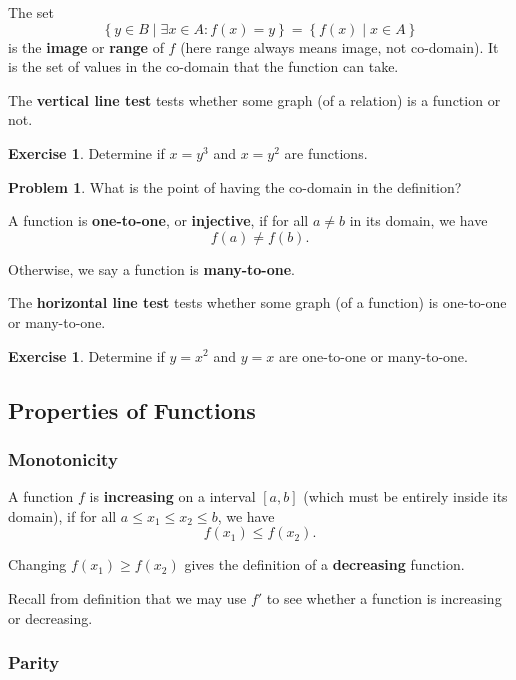 \documentclass[11pt]{article}
\theoremstyle{definition}
\newtheorem{example}[theorem]{Exercise}
\newtheorem{problem}[theorem]{Problem}
\theoremstyle{remark}
\newcommand{\pqty}[1]{\left(#1\right)}
\newcommand{\set}[2]{\left\{#1\mid #2\right\}}
\newcommand{\ccintv}[2]{[#1,#2]}
\begin{document}
The set
\[
    \set{y \in B}{\exists x \in A: f\pqty{x} = y} = \set{f\pqty{x}}{x \in A}
\]
is the \textbf{image} or \textbf{range} of \(f\) (here range always means image, not co-domain). It is the set of values in the co-domain that the function can take.

The \textbf{vertical line test} tests whether some graph (of a relation) is a function or not.

\begin{example}\label{tmua-5-unit-002}
    Determine if \(x = y^3\) and \(x = y^2\) are functions.
\end{example}

\begin{problem}\label{tmua-5-unit-003}
    What is the point of having the co-domain in the definition?
\end{problem}

A function is \textbf{one-to-one}, or \textbf{injective}, if for all \(a \neq b\) in its domain, we have
\[
    f\pqty{a} \neq f\pqty{b}.
\]

Otherwise, we say a function is \textbf{many-to-one}.

The \textbf{horizontal line test} tests whether some graph (of a function) is one-to-one or many-to-one.

\begin{example}\label{tmua-5-unit-004}
    Determine if \(y = x^2\) and \(y = x\) are one-to-one or many-to-one.
\end{example}

\subsection{Properties of Functions}\label{tmua-5-subsection-002}
\subsubsection{Monotonicity}\label{tmua-5-subsubsection-001}

A function \(f\) is \textbf{increasing} on a interval \(\ccintv{a}{b}\) (which must be entirely inside its domain), if for all \(a \leq x_1 \leq x_2 \leq b\), we have
\[
    f\pqty{x_1} \leq f\pqty{x_2}.
\]

Changing \(f\pqty{x_1} \geq f\pqty{x_2}\) gives the definition of a \textbf{decreasing} function.

Recall from definition that we may use \(f'\) to see whether a function is increasing or decreasing.

\subsubsection{Parity}\label{tmua-5-subsubsection-002}
\end{document}
